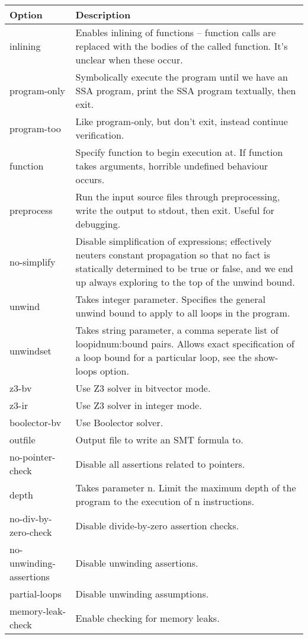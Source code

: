 \documentclass{article}
\begin{document}
\begin{longtable}{| p{} | p{} |} 
\hline
Option & Description\\
\hline
inlining & Enables inlining of functions -- function calls are replaced with the
bodies of the called function. It's unclear when these occur.\\
\hline
program-only & Symbolically execute the program until we have an SSA program,
print the SSA program textually, then exit.\\
\hline
program-too & Like program-only, but don't exit, instead continue
verification.\\
\hline
function & Specify function to begin execution at. If function takes arguments,
horrible undefined behaviour occurs.\\
\hline
preprocess & Run the input source files through preprocessing, write the output
to stdout, then exit. Useful for debugging.\\
\hline
no-simplify & Disable simplification of expressions; effectively neuters
constant propagation so that no fact is statically determined to be true or
false, and we end up always exploring to the top of the unwind bound.\\
\hline
unwind & Takes integer parameter. Specifies the general unwind bound to apply
to all loops in the program.\\
\hline
unwindset & Takes string parameter, a comma seperate list of loopidnum:bound
pairs. Allows exact specification of a loop bound for a particular loop, see
the show-loops option.\\
\hline
z3-bv & Use Z3 solver in bitvector mode.\\
\hline
z3-ir & Use Z3 solver in integer mode.\\
\hline
boolector-bv & Use Boolector solver.\\
\hline
outfile & Output file to write an SMT formula to.\\
\hline
no-pointer-check & Disable all assertions related to pointers.\\
\hline
depth & Takes parameter n. Limit the maximum depth of the program to the
execution of n instructions.\\
\hline
no-div-by-zero-check & Disable divide-by-zero assertion checks.\\
\hline
no-unwinding-assertions & Disable unwinding assertions.\\
\hline
partial-loops & Disable unwinding assumptions.\\
\hline
memory-leak-check & Enable checking for memory leaks.\\

\end{longtable}
\end{document}
